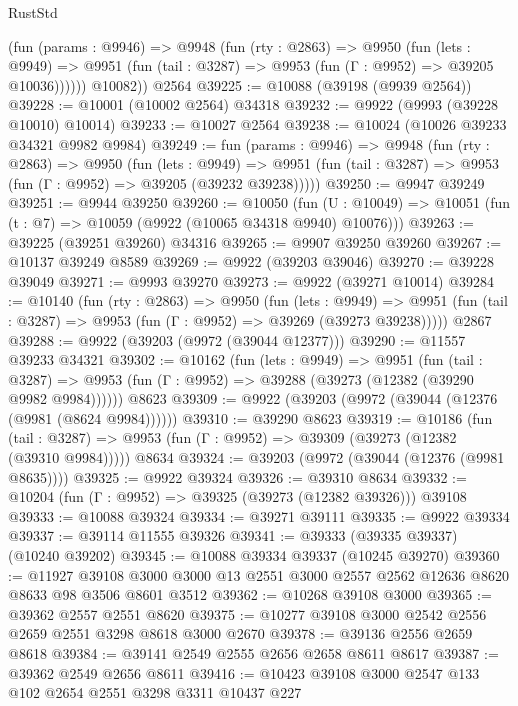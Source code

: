 \begin{lexlean}{RustStd}
\begin{coremodule}
          (fun (params : @9946) =>
          @9948
            (fun (rty : @2863) =>
            @9950
              (fun (lets : @9949) =>
              @9951 (fun (tail : @3287) => @9953 (fun (Γ : @9952) => @39205 @10036))))))
        @10082))
    @2564
@39225 := @10088 (@39198 (@9939 @2564))
@39228 := @10001 (@10002 @2564) @34318
@39232 := @9922 (@9993 (@39228 @10010) @10014)
@39233 := @10027 @2564
@39238 := @10024 (@10026 @39233 @34321 @9982 @9984)
@39249 := fun (params : @9946) =>
  @9948
    (fun (rty : @2863) =>
    @9950
      (fun (lets : @9949) =>
      @9951 (fun (tail : @3287) => @9953 (fun (Γ : @9952) => @39205 (@39232 @39238)))))
@39250 := @9947 @39249
@39251 := @9944 @39250
@39260 := @10050
    (fun (U : @10049) => @10051 (fun (t : @7) => @10059 (@9922 (@10065 @34318 @9940) @10076)))
@39263 := @39225 (@39251 @39260) @34316
@39265 := @9907 @39250 @39260
@39267 := @10137 @39249 @8589
@39269 := @9922 (@39203 @39046)
@39270 := @39228 @39049
@39271 := @9993 @39270
@39273 := @9922 (@39271 @10014)
@39284 := @10140
    (fun (rty : @2863) =>
    @9950
      (fun (lets : @9949) =>
      @9951 (fun (tail : @3287) => @9953 (fun (Γ : @9952) => @39269 (@39273 @39238)))))
    @2867
@39288 := @9922 (@39203 (@9972 (@39044 @12377)))
@39290 := @11557 @39233 @34321
@39302 := @10162
    (fun (lets : @9949) =>
    @9951
      (fun (tail : @3287) =>
      @9953 (fun (Γ : @9952) => @39288 (@39273 (@12382 (@39290 @9982 @9984))))))
    @8623
@39309 := @9922 (@39203 (@9972 (@39044 (@12376 (@9981 (@8624 @9984))))))
@39310 := @39290 @8623
@39319 := @10186
    (fun (tail : @3287) => @9953 (fun (Γ : @9952) => @39309 (@39273 (@12382 (@39310 @9984)))))
    @8634
@39324 := @39203 (@9972 (@39044 (@12376 (@9981 @8635))))
@39325 := @9922 @39324
@39326 := @39310 @8634
@39332 := @10204 (fun (Γ : @9952) => @39325 (@39273 (@12382 @39326))) @39108
@39333 := @10088 @39324
@39334 := @39271 @39111
@39335 := @9922 @39334
@39337 := @39114 @11555 @39326
@39341 := @39333 (@39335 @39337) (@10240 @39202)
@39345 := @10088 @39334 @39337 (@10245 @39270)
@39360 := @11927
    @39108
    @3000
    @3000
    @13
    @2551
    @3000
    @2557
    @2562
    @12636
    @8620
    @8633
    @98
    @3506
    @8601
    @3512
@39362 := @10268 @39108 @3000
@39365 := @39362 @2557 @2551 @8620
@39375 := @10277 @39108 @3000 @2542 @2556 @2659 @2551 @3298 @8618 @3000 @2670
@39378 := @39136 @2556 @2659 @8618
@39384 := @39141 @2549 @2555 @2656 @2658 @8611 @8617
@39387 := @39362 @2549 @2656 @8611
@39416 := @10423
    @39108
    @3000
    @2547
    @133
    @102
    @2654
    @2551
    @3298
    @3311
    @10437
    @227

\end{coremodule}
\end{lexlean}
